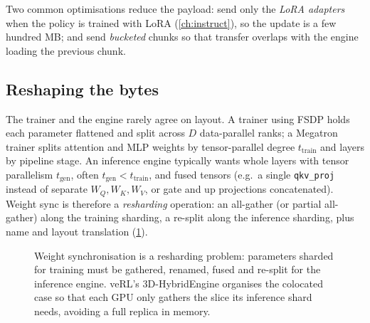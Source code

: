 Two common optimisations reduce the payload: send only the \emph{LoRA adapters} when the
policy is trained with LoRA (\cref{ch:instruct}), so the update is a few hundred MB; and send
\emph{bucketed} chunks so that transfer overlaps with the engine loading the previous chunk.

\subsection{Reshaping the bytes}

The trainer and the engine rarely agree on layout. A trainer using FSDP holds each parameter
flattened and split across $D$ data-parallel ranks; a Megatron trainer splits attention and MLP
weights by tensor-parallel degree $t_{\text{train}}$ and layers by pipeline stage. An inference
engine typically wants whole layers with tensor parallelism $t_{\text{gen}}$, often
$t_{\text{gen}} < t_{\text{train}}$, and fused tensors (e.g.\ a single \texttt{qkv\_proj}
instead of separate $W_Q, W_K, W_V$, or gate and up projections concatenated). Weight sync is
therefore a \emph{resharding} operation: an all-gather (or partial all-gather) along the
training sharding, a re-split along the inference sharding, plus name and layout translation
(\cref{fig:rlsys:reshard}).

\begin{figure}[t]
\centering
{}
\caption{Weight synchronisation is a resharding problem: parameters sharded for training
must be gathered, renamed, fused and re-split for the inference engine. veRL's
3D-HybridEngine organises the colocated case so that each GPU only gathers the slice its
inference shard needs, avoiding a full replica in memory.}
\label{fig:rlsys:reshard}
\end{figure}

